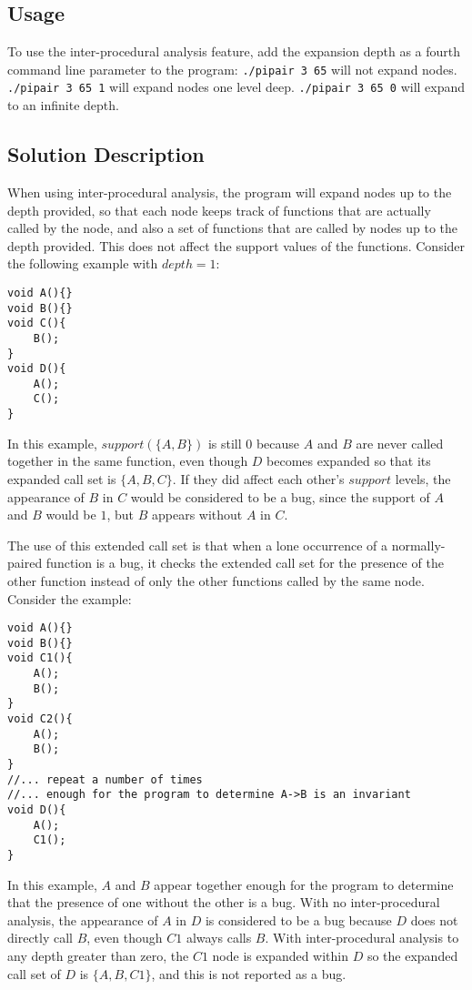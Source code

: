 \documentclass[10pt,a4paper]{article}
\author{Patrick White}
\begin{document}
\subsection{Usage}
To use the inter-procedural analysis feature, add the expansion depth as a fourth command line parameter to the program: \texttt{./pipair 3 65} will not expand nodes. \texttt{./pipair 3 65 1} will expand nodes one level deep. \texttt{./pipair 3 65 0} will expand to an infinite depth.
\subsection{Solution Description}
When using inter-procedural analysis, the program will expand nodes up to the depth provided, so that each node keeps track of functions that are actually called by the node, and also a set of functions that are called by nodes up to the depth provided. This does not affect the support values of the functions. Consider the following example with $depth=1$:
\begin{verbatim}
void A(){}
void B(){}
void C(){
	B();
}
void D(){
	A();
	C();
}
\end{verbatim}
In this example, $support(\{A,B\})$ is still $0$ because $A$ and $B$ are never called together in the same function, even though $D$ becomes expanded so that its expanded call set is $\{A,B,C\}$. If they did affect each other's $support$ levels, the appearance of $B$ in $C$ would be considered to be a bug, since the support of $A$ and $B$ would be $1$, but $B$ appears without $A$ in $C$.

\noindent The use of this extended call set is that when a lone occurrence of a normally-paired function is a bug, it checks the extended call set for the presence of the other function instead of only the other functions called by the same node. Consider the example:
\begin{verbatim}
void A(){}
void B(){}
void C1(){
	A();
	B();
}
void C2(){
	A();
	B();
}
//... repeat a number of times
//... enough for the program to determine A->B is an invariant
void D(){
	A();
	C1();
}
\end{verbatim}
In this example, $A$ and $B$ appear together enough for the program to determine that the presence of one without the other is a bug. With no inter-procedural analysis, the appearance of $A$ in $D$ is considered to be a bug because $D$ does not directly call $B$, even though $C1$ always calls $B$. With inter-procedural analysis to any depth greater than zero, the $C1$ node is expanded within $D$ so the expanded call set of $D$ is $\{A,B,C1\}$, and this is not reported as a bug.
\end{document}

